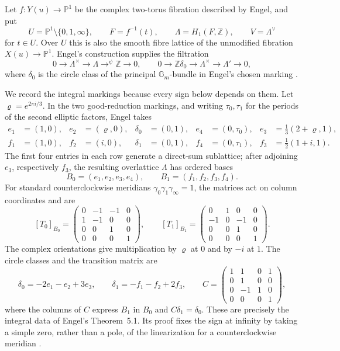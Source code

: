\documentclass[11pt]{article}
\numberwithin{equation}{section}
\begin{document}
Let $f:Y(u)\to\mathbb P^1$ be the complex two-torus fibration described by
Engel, and put
\[
 U=\mathbb P^1\setminus\{0,1,\infty\},\qquad
 F=f^{-1}(t),\qquad \Lambda=H_1(F,\mathbb Z),\qquad
 V=\Lambda^\vee
\]
for $t\in U$.  Over $U$ this is also the smooth fibre lattice of the
unmodified fibration $X(u)\to\mathbb P^1$.  Engel's construction supplies
the filtration
\[
 0\longrightarrow\Lambda^\times\longrightarrow\Lambda
   \mathrel{\mathop{\longrightarrow}^{\psi}}\mathbb Z\longrightarrow0,
 \qquad
 0\longrightarrow\mathbb Z\delta_0\longrightarrow\Lambda^\times
   \longrightarrow\Lambda'\longrightarrow0,                 \tag{1.2}
\]
where $\delta_0$ is the circle class of the principal
$\mathbb G_m$-bundle in Engel's chosen marking
\cite[Sections 2 and 5]{Engel}.

We record the integral markings because every sign below depends on them.
Let $\varrho=e^{2\pi i/3}$.  In the two good-reduction markings, and writing
$\tau_0,\tau_1$ for the periods of the second elliptic factors, Engel takes
\[
\begin{aligned}
 e_1&=(1,0),& e_2&=(\varrho,0),& \delta_0&=(0,1),&e_4&=(0,\tau_0),
 &e_3&=\tfrac13(2+\varrho,1),\\
 f_1&=(1,0),& f_2&=(i,0),& \delta_1&=(0,1),&f_4&=(0,\tau_1),
 &f_3&=\tfrac12(1+i,1).
\end{aligned}                                                   \tag{1.3}
\]
The first four entries in each row generate a direct-sum sublattice; after
adjoining $e_3$, respectively $f_3$, the resulting overlattice $\Lambda$ has
ordered bases
\[
             B_0=(e_1,e_2,e_3,e_4),\qquad
             B_1=(f_1,f_2,f_3,f_4).
\]
For standard counterclockwise meridians
$\gamma_0\gamma_1\gamma_\infty=1$, the matrices act on column coordinates
and are
\[
 [T_0]_{B_0}=
 \begin{pmatrix}
 0&-1&-1&0\\ 1&-1&0&0\\ 0&0&1&0\\ 0&0&0&1
 \end{pmatrix},\qquad
 [T_1]_{B_1}=
 \begin{pmatrix}
 0&1&0&0\\ -1&0&-1&0\\ 0&0&1&0\\ 0&0&0&1
 \end{pmatrix}.                                                  \tag{1.4}
\]
The complex orientations give multiplication by $\varrho$ at $0$ and by
$-i$ at $1$.  The circle classes and the transition matrix are
\[
 \delta_0=-2e_1-e_2+3e_3,\qquad
 \delta_1=-f_1-f_2+2f_3,\qquad
 C=
 \begin{pmatrix}
 1&1&0&1\\0&1&0&0\\0&-1&1&0\\0&0&0&1
 \end{pmatrix},                                                   \tag{1.5}
\]
where the columns of $C$ express $B_1$ in $B_0$ and
$C\delta_1=\delta_0$.  These are precisely the integral data of
Engel's Theorem~5.1.  Its proof fixes the sign at infinity by taking a
simple zero, rather than a pole, of the linearization for a counterclockwise
meridian \cite[pp.~12--15]{Engel}.
\end{document}
